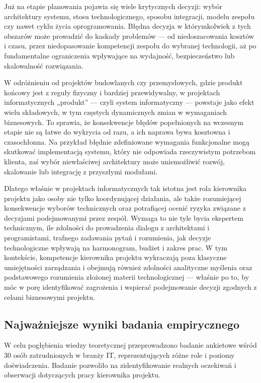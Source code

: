 Już na etapie planowania pojawia się wiele krytycznych decyzji: wybór architektury systemu, stosu technologicznego, sposobu integracji, modelu zespołu czy nawet cyklu życia oprogramowania. Błędna decyzja w którymkolwiek z tych obszarów może prowadzić do kaskady problemów — od niedoszacowania kosztów i czasu, przez niedopasowanie kompetencji zespołu do wybranej technologii, aż po fundamentalne ograniczenia wpływające na wydajność, bezpieczeństwo lub skalowalność rozwiązania.

W odróżnieniu od projektów budowlanych czy przemysłowych, gdzie produkt końcowy jest z reguły fizyczny i bardziej przewidywalny, w projektach informatycznych „produkt” — czyli system informatyczny — powstaje jako efekt wielu składowych, w tym częstych dynamicznych zmian w wymaganiach biznesowych. To sprawia, że konsekwencje błędów popełnionych na wczesnym etapie nie są łatwe do wykrycia od razu, a ich naprawa bywa kosztowna i czasochłonna. Na przykład błędnie zdefiniowane wymagania funkcjonalne mogą skutkować implementacją systemu, który nie odpowiada rzeczywistym potrzebom klienta, zaś wybór niewłaściwej architektury może uniemożliwić rozwój, skalowanie lub integrację z przyszłymi modułami.

Dlatego właśnie w projektach informatycznych tak istotna jest rola kierownika projektu jako osoby nie tylko koordynującej działania, ale także rozumiejącej konsekwencje wyborów technicznych oraz potrafiącej ocenić ryzyka związane z decyzjami podejmowanymi przez zespół. Wymaga to nie tyle bycia ekspertem technicznym, ile zdolności do prowadzenia dialogu z architektami i programistami, trafnego zadawania pytań i rozumienia, jak decyzje technologiczne wpływają na harmonogram, budżet i zakres prac. W tym kontekście, kompetencje kierownika projektu wykraczają poza klasyczne umiejętności zarządzania i obejmują również zdolności analityczne myślenia oraz podstawowego rozumienia złożonej materii technologicznej — właśnie po to, by móc w porę identyfikować zagrożenia i wspierać podejmowanie decyzji zgodnych z celami biznesowymi projektu.

\subsection{Najważniejsze wyniki badania empirycznego}

W celu pogłębienia wiedzy teoretycznej przeprowadzono badanie ankietowe wśród 30 osób zatrudnionych w branży IT, reprezentujących różne role i poziomy doświadczenia. Badanie pozwoliło na zidentyfikowanie realnych oczekiwań i obserwacji dotyczących pracy kierownika projektu.

